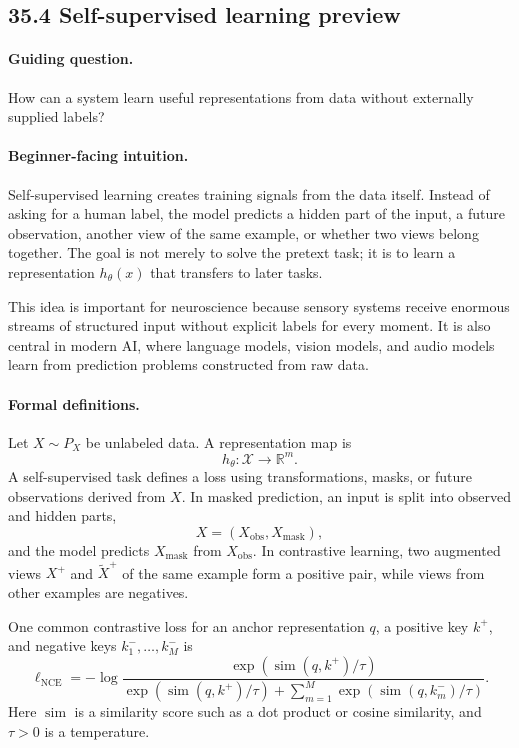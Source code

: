 \subsection{35.4 Self-supervised learning preview}

\paragraph{Guiding question.}
How can a system learn useful representations from data without externally supplied labels?

\paragraph{Beginner-facing intuition.}
Self-supervised learning creates training signals from the data itself. Instead of asking for a human label, the model predicts a hidden part of the input, a future observation, another view of the same example, or whether two views belong together. The goal is not merely to solve the pretext task; it is to learn a representation \(h_\theta(x)\) that transfers to later tasks.

This idea is important for neuroscience because sensory systems receive enormous streams of structured input without explicit labels for every moment. It is also central in modern AI, where language models, vision models, and audio models learn from prediction problems constructed from raw data.

\paragraph{Formal definitions.}
Let \(X\sim P_X\) be unlabeled data. A representation map is
\[
h_\theta:\mathcal X\to\mathbb R^m.
\]
A self-supervised task defines a loss using transformations, masks, or future observations derived from \(X\). In masked prediction, an input is split into observed and hidden parts,
\[
X=(X_{\mathrm{obs}},X_{\mathrm{mask}}),
\]
and the model predicts \(X_{\mathrm{mask}}\) from \(X_{\mathrm{obs}}\). In contrastive learning, two augmented views \(X^+\) and \(\widetilde X^+\) of the same example form a positive pair, while views from other examples are negatives.

One common contrastive loss for an anchor representation \(q\), a positive key \(k^+\), and negative keys \(k_1^-,\ldots,k_M^-\) is
\[
\boxed{
\ell_{\mathrm{NCE}}
=-\log
\frac{\exp(\operatorname{sim}(q,k^+)/\tau)}
{\exp(\operatorname{sim}(q,k^+)/\tau)+\sum_{m=1}^M\exp(\operatorname{sim}(q,k_m^-)/\tau)}.
}
\]
Here \(\operatorname{sim}\) is a similarity score such as a dot product or cosine similarity, and \(\tau>0\) is a temperature.

